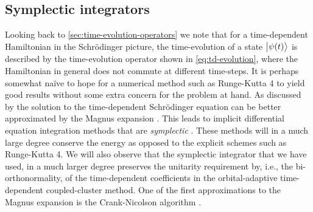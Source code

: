         \subsection{Symplectic integrators}
            Looking back to \autoref{sec:time-evolution-operators} we note that
            for a time-dependent Hamiltonian in the Schrödinger picture, the
            time-evolution of a state $\ket{\psi(t)}$ is described by the
            time-evolution operator shown in \autoref{eq:td-evolution}, where
            the Hamiltonian in general does not commute at different time-steps.
            It is perhaps somewhat naïve to hope for a numerical method such as
            Runge-Kutta 4 to yield good results without some extra concern for
            the problem at hand.
            As discussed by \citeauthor{joshua-magnus} \cite{joshua-magnus} the
            solution to the time-dependent Schrödinger equation can be better
            approximated by the Magnus expansion \cite{magnus-expansion}.
            This leads to implicit differential equation integration methods
            that are \emph{symplectic} \cite{joshua-magnus}.
            These methods will in a much large degree conserve the energy as
            opposed to the explicit schemes such as Runge-Kutta 4.
            We will also observe that the symplectic integrator that we have
            used, in a much larger degree preserves the unitarity requirement
            by, i.e., the bi-orthonormality, of the time-dependent coefficients
            in the orbital-adaptive time-dependent coupled-cluster method.
            One of the first approximations to the Magnus expansion is the
            Crank-Nicolson algorithm \cite{ullrich2011time}.

